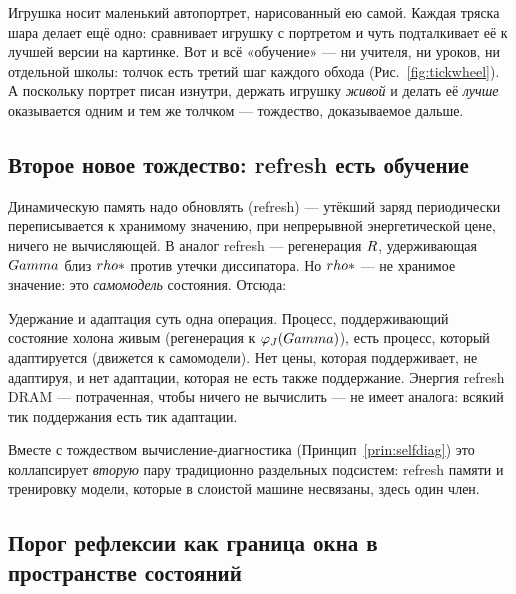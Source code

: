 \begin{zerobox}
Игрушка носит маленький автопортрет, нарисованный ею самой. Каждая тряска
шара делает ещё одно: сравнивает игрушку с портретом и чуть подталкивает её
к лучшей версии на картинке. Вот и всё «обучение» --- ни учителя, ни уроков,
ни отдельной школы: толчок есть третий шаг каждого обхода
(Рис.~\ref{fig:tickwheel}). А поскольку портрет писан изнутри, держать
игрушку \emph{живой} и делать её \emph{лучше} оказывается одним и тем же
толчком --- тождество, доказываемое дальше.
\end{zerobox}

\subsection{Второе новое тождество: refresh есть обучение}

Динамическую память надо обновлять (refresh) --- утёкший заряд периодически
переписывается к хранимому значению, при непрерывной энергетической цене,
ничего не вычисляющей. В \TALOS{} аналог refresh --- регенерация $R$,
удерживающая $Gamma$ близ $rho*$ против утечки диссипатора. Но $rho*$ ---
не хранимое значение: это \emph{самомодель} состояния. Отсюда:

\begin{principle}\label{prin:refresh}
Удержание и адаптация суть одна операция. Процесс, поддерживающий состояние
холона живым (регенерация к $\varphi_J(Gamma)$), есть процесс, который
адаптируется (движется к самомодели). Нет цены, которая поддерживает, не
адаптируя, и нет адаптации, которая не есть также поддержание. Энергия refresh
DRAM --- потраченная, чтобы ничего не вычислить --- не имеет аналога: всякий тик
поддержания есть тик адаптации.
\end{principle}

\noindent Вместе с тождеством вычисление-диагностика
(Принцип~\ref{prin:selfdiag}) это коллапсирует \emph{вторую} пару традиционно
раздельных подсистем: refresh памяти и тренировку модели, которые в слоистой
машине несвязаны, здесь один член.

\subsection{Порог рефлексии как граница окна в пространстве состояний}

